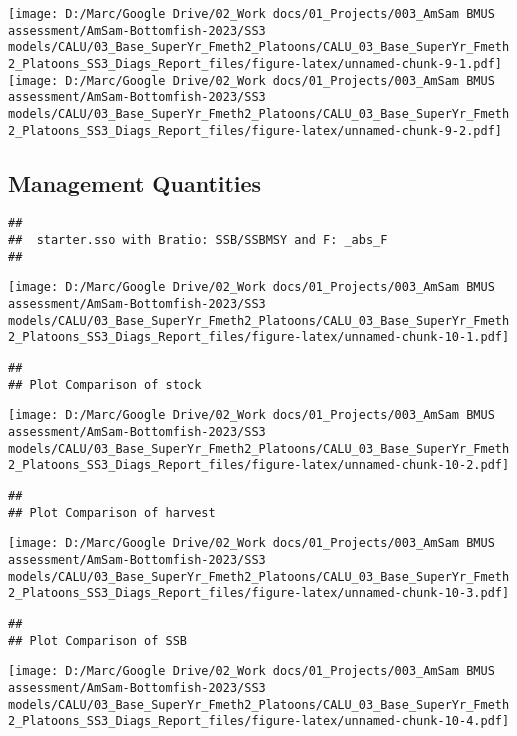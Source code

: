 \documentclass[
]{article}
\begin{document}
\texttt{[image: D:/Marc/Google Drive/02\_Work docs/01\_Projects/003\_AmSam BMUS assessment/AmSam-Bottomfish-2023/SS3 models/CALU/03\_Base\_SuperYr\_Fmeth2\_Platoons/CALU\_03\_Base\_SuperYr\_Fmeth2\_Platoons\_SS3\_Diags\_Report\_files/figure-latex/unnamed-chunk-9-1.pdf]}
\texttt{[image: D:/Marc/Google Drive/02\_Work docs/01\_Projects/003\_AmSam BMUS assessment/AmSam-Bottomfish-2023/SS3 models/CALU/03\_Base\_SuperYr\_Fmeth2\_Platoons/CALU\_03\_Base\_SuperYr\_Fmeth2\_Platoons\_SS3\_Diags\_Report\_files/figure-latex/unnamed-chunk-9-2.pdf]}

\hypertarget{management-quantities}{%
\subsection{Management Quantities}\label{management-quantities}}

\begin{verbatim}
## 
##  starter.sso with Bratio: SSB/SSBMSY and F: _abs_F 
## 
\end{verbatim}

\texttt{[image: D:/Marc/Google Drive/02\_Work docs/01\_Projects/003\_AmSam BMUS assessment/AmSam-Bottomfish-2023/SS3 models/CALU/03\_Base\_SuperYr\_Fmeth2\_Platoons/CALU\_03\_Base\_SuperYr\_Fmeth2\_Platoons\_SS3\_Diags\_Report\_files/figure-latex/unnamed-chunk-10-1.pdf]}

\begin{verbatim}
## 
## Plot Comparison of stock
\end{verbatim}

\texttt{[image: D:/Marc/Google Drive/02\_Work docs/01\_Projects/003\_AmSam BMUS assessment/AmSam-Bottomfish-2023/SS3 models/CALU/03\_Base\_SuperYr\_Fmeth2\_Platoons/CALU\_03\_Base\_SuperYr\_Fmeth2\_Platoons\_SS3\_Diags\_Report\_files/figure-latex/unnamed-chunk-10-2.pdf]}

\begin{verbatim}
## 
## Plot Comparison of harvest
\end{verbatim}

\texttt{[image: D:/Marc/Google Drive/02\_Work docs/01\_Projects/003\_AmSam BMUS assessment/AmSam-Bottomfish-2023/SS3 models/CALU/03\_Base\_SuperYr\_Fmeth2\_Platoons/CALU\_03\_Base\_SuperYr\_Fmeth2\_Platoons\_SS3\_Diags\_Report\_files/figure-latex/unnamed-chunk-10-3.pdf]}

\begin{verbatim}
## 
## Plot Comparison of SSB
\end{verbatim}

\texttt{[image: D:/Marc/Google Drive/02\_Work docs/01\_Projects/003\_AmSam BMUS assessment/AmSam-Bottomfish-2023/SS3 models/CALU/03\_Base\_SuperYr\_Fmeth2\_Platoons/CALU\_03\_Base\_SuperYr\_Fmeth2\_Platoons\_SS3\_Diags\_Report\_files/figure-latex/unnamed-chunk-10-4.pdf]}
\end{document}
